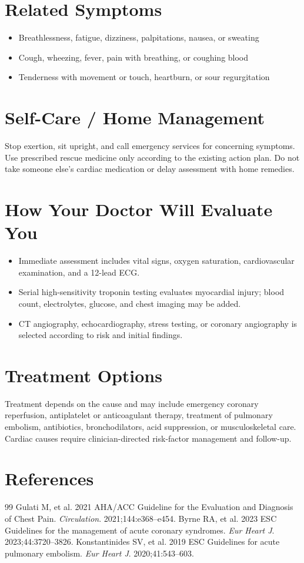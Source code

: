 \section*{Related Symptoms}
\begin{itemize}
  \item Breathlessness, fatigue, dizziness, palpitations, nausea, or sweating
  \item Cough, wheezing, fever, pain with breathing, or coughing blood
  \item Tenderness with movement or touch, heartburn, or sour regurgitation
\end{itemize}

\section*{Self-Care / Home Management}
Stop exertion, sit upright, and call emergency services for concerning symptoms. Use prescribed rescue medicine only according to the existing action plan. Do not take someone else’s cardiac medication or delay assessment with home remedies.

\section*{How Your Doctor Will Evaluate You}
\begin{itemize}
  \item Immediate assessment includes vital signs, oxygen saturation, cardiovascular examination, and a 12-lead ECG.
  \item Serial high-sensitivity troponin testing evaluates myocardial injury; blood count, electrolytes, glucose, and chest imaging may be added.
  \item CT angiography, echocardiography, stress testing, or coronary angiography is selected according to risk and initial findings.
\end{itemize}

\section*{Treatment Options}
Treatment depends on the cause and may include emergency coronary reperfusion, antiplatelet or anticoagulant therapy, treatment of pulmonary embolism, antibiotics, bronchodilators, acid suppression, or musculoskeletal care. Cardiac causes require clinician-directed risk-factor management and follow-up.

\section*{References}
\begin{thebibliography}{99}
 Gulati M, et al. 2021 AHA/ACC Guideline for the Evaluation and Diagnosis of Chest Pain. \textit{Circulation}. 2021;144:e368--e454.
 Byrne RA, et al. 2023 ESC Guidelines for the management of acute coronary syndromes. \textit{Eur Heart J}. 2023;44:3720--3826.
 Konstantinides SV, et al. 2019 ESC Guidelines for acute pulmonary embolism. \textit{Eur Heart J}. 2020;41:543--603.
\end{thebibliography}
